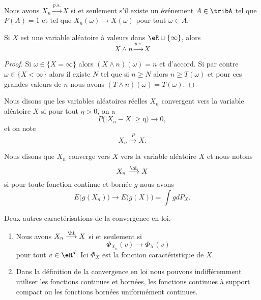 \begin{lemma}
    Nous avons \( X_n\stackrel{p.s.}{\longrightarrow}X\) si et seulement s'il existe un événement \( A\in\tribA\) tel que \( P(A)=1\) et tel que \( X_n(\omega)\to X(\omega)\) pour tout \( \omega\in A\).
\end{lemma}

\begin{lemma}
    Si \( X\) est une variable aléatoire à valeurs dans \( \eR\cup\{ \infty \}\), alors
    \begin{equation}
        X\wedge n\stackrel{p.s.}{\longrightarrow}X
    \end{equation}
\end{lemma}

\begin{proof}
    Si \( \omega\in\{ X=\infty \}\) alors \( (X\wedge n)(\omega)=n\) et d'accord. Si par contre \( \omega\in\{ X<\infty \}\) alors il existe \( N\) tel que si \( n\geq N\) alors \( n\geq T(\omega)\) et pour ces grandes valeurs de \( n\) nous avons \( (T\wedge n)(\omega)=T(\omega)\).
\end{proof}


Nous disons que les variables aléatoires réelles \( X_n\) convergent  vers la variable aléatoire \( X\) si pour tout \( \eta>0\), on a
\begin{equation}
    P\big( | X_n-X |\geq \eta \big)\to 0,
\end{equation}
et on note
\begin{equation}
    X_n\stackrel{P}{\longrightarrow}X.
\end{equation}

Nous disons que \( X_n\) converge vers \( X\)  vers la variable aléatoire \( X\) et nous notons
\begin{equation}
    X_n\stackrel{\hL}{\longrightarrow}X
\end{equation}
si pour toute fonction continue et bornée \( g\) nous avons
\begin{equation}
    E\big( g(X_n) \big)\to E\big( g(X) \big)=\int gdP_X.
\end{equation}

\begin{proposition}     \label{PrpopCaractCvL}
    Deux autres caractérisations de la convergence en loi.
    \begin{enumerate}
        \item
            Nous avons \( X_n\stackrel{\hL}{\longrightarrow}X\) si et seulement si
            \begin{equation}
                \Phi_{X_n}(v)\to\Phi_X(v)
            \end{equation}
            pour tout \( v\in\eR^d\). Ici \( \Phi_X\) est la fonction caractéristique de \( X\).
        \item
            Dans la définition de la convergence en loi nous pouvons indifféremment utiliser les fonctions continues et bornées, les fonctions continues à support compact ou les fonctions bornées uniformément continues.
    \end{enumerate}
\end{proposition}


